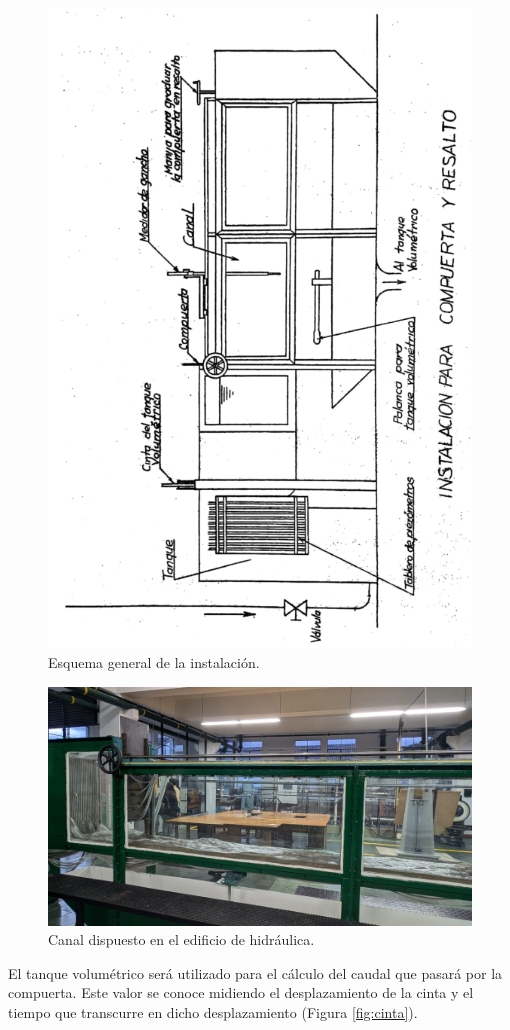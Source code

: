 \documentclass[10pt, a4paper]{exam}
\begin{document}
\begin{figure}[h]
    \centering
    \includegraphics[angle=270,width=0.75\linewidth]{Images/esquema.png}
    \caption{Esquema general de la instalación.}
    \label{fig:esqpdf}
\end{figure}

\begin{figure}[h]
    \centering
    \includegraphics[width=0.75\linewidth]{Images/real.jpg}
    \caption{Canal dispuesto en el edificio de hidráulica.}
    \label{fig:esqreal}
\end{figure}

El tanque volumétrico será utilizado para el cálculo del caudal que pasar\'a por la compuerta. Este valor se conoce midiendo el desplazamiento de la cinta y el tiempo que transcurre en dicho desplazamiento (Figura \ref{fig:cinta}). 
\end{document}
